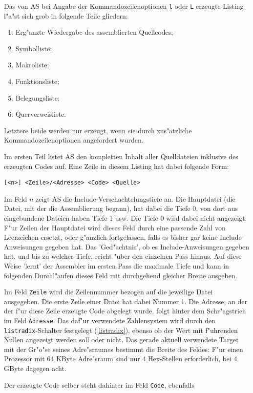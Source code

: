 \documentclass[12pt,a4paper,twoside]{report}
\newcommand{\tty}[1]{{\tt #1}}
\newcommand{\asname}{AS}
\begin{document}
Das von \asname{} bei Angabe der Kommandozeilenoptionen \tty{l} oder \tty{L}
erzeugte Listing l"a"st sich grob in folgende Teile gliedern:
\begin{enumerate}
\item{Erg"anzte Wiedergabe des assemblierten Quellcodes;}
\item{Symbolliste;}
\item{Makroliste;}
\item{Funktionsliste;}
\item{Belegungsliste;}
\item{Querverweisliste.}
\end{enumerate}
Letztere beide werden nur erzeugt, wenn sie durch zus"atzliche
Kommandozeilenoptionen angefordert wurden.
\par
Im ersten Teil listet \asname{} den kompletten Inhalt aller Quelldateien inklusive
des erzeugten Codes auf.  Eine Zeile in diesem Listing hat dabei folgende Form:
\begin{verbatim}
[<n>] <Zeile>/<Adresse> <Code> <Quelle>
\end{verbatim}
Im Feld $n$ zeigt \asname{} die Include-Verschachtelungstiefe an.  Die
Hauptdatei (die Datei, mit der die Assemblierung begann), hat dabei die
Tiefe 0, von dort aus eingebundene Dateien haben Tiefe 1 usw.  Die Tiefe
0 wird dabei nicht angezeigt: F"ur Zeilen der Hauptdatei wird dieses Feld
durch eine passende Zahl von Leerzeichen ersetzt, oder g"anzlich fortgelassen,
falls es bisher gar keine Include-Anweisungen gegeben hat.  Das 'Ged"achtnis',
ob es Include-Anweisungen gegeben hat, und bis zu welcher Tiefe, reicht
"uber den einzelnen Pass hinaus.  Auf diese Weise 'lernt' der Assembler im
ersten Pass die maximale Tiefe und kann in folgenden Durchl"aufen dieses
Feld mit durchgehend gleicher Breite ausgeben.
\par
Im Feld \tty{Zeile} wird die Zeilennummer bezogen auf die jeweilige Datei
ausgegeben.  Die erste Zeile einer Datei hat dabei Nummer 1.  Die Adresse,
an der der f"ur diese Zeile erzeugte Code abgelegt wurde, folgt hinter dem
Schr"agstrich im Feld \tty{Adresse}.  Das daf"ur verwendete Zahlensystem
wird durch den {\tt listradix}-Schalter festgelegt (\ref{listradix}), ebenso
ob der Wert mit f"uhrenden Nullen angezeigt werden soll oder nicht.  Das
gerade aktuell verwendete Target mit der Gr"o"se seines Adre"sraumes bestimmt
die Breite des Feldes: F"ur einen Prozessor mit 64 KByte Adre"sraum sind
nur 4 Hex-Stellen erforderlich, bei 4 GByte dagegen acht.
\par
Der erzeugte Code selber steht dahinter im Feld \tty{Code}, ebenfalls
\end{document}
